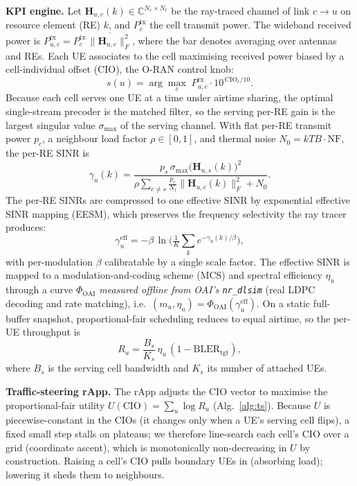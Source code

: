 \documentclass[conference]{IEEEtran}
\begin{document}
\textbf{KPI engine.} Let $\mathbf{H}_{u,c}(k)\in\mathbb{C}^{N_r\times N_t}$ be the
ray-traced channel of link $c\!\to\!u$ on resource element (RE) $k$, and
$P^{\mathrm{tx}}_c$ the cell transmit power. The wideband received power is
$P^{\mathrm{rx}}_{u,c}=P^{\mathrm{tx}}_c\,\overline{\lVert\mathbf{H}_{u,c}\rVert_F^2}$,
where the bar denotes averaging over antennas and REs. Each UE associates to the
cell maximising received power biased by a cell-individual offset (CIO), the
O-RAN control knob:
\begin{equation}
s(u)=\arg\max_{c}\; P^{\mathrm{rx}}_{u,c}\cdot 10^{\,\mathrm{CIO}_c/10}.
\label{eq:assoc}
\end{equation}
Because each cell serves one UE at a time under airtime sharing, the optimal
single-stream precoder is the matched filter, so the serving per-RE gain is the
largest singular value $\sigma_{\max}$ of the serving channel. With flat per-RE
transmit power $p_c$, a neighbour load factor $\rho\in[0,1]$, and thermal noise
$N_0=kTB\cdot\mathrm{NF}$, the per-RE SINR is
\begin{equation}
\gamma_u(k)=\frac{p_{s}\,\sigma_{\max}\!\big(\mathbf{H}_{u,s}(k)\big)^2}
{\rho\sum_{c\neq s}\frac{p_c}{N_t}\lVert\mathbf{H}_{u,c}(k)\rVert_F^2+N_0}.
\label{eq:sinr}
\end{equation}
The per-RE SINRs are compressed to one effective SINR by exponential effective
SINR mapping (EESM), which preserves the frequency selectivity the ray tracer
produces:
\begin{equation}
\gamma^{\mathrm{eff}}_u=-\beta\,\ln\!\Big(\tfrac{1}{K}\textstyle\sum_{k}
e^{-\gamma_u(k)/\beta}\Big),
\label{eq:eesm}
\end{equation}
with per-modulation $\beta$ calibratable by a single scale factor. The effective
SINR is mapped to a modulation-and-coding scheme (MCS) and spectral efficiency
$\eta_u$ through a curve $\Phi_{\mathrm{OAI}}$ \emph{measured offline from OAI's
\texttt{nr\_dlsim}} (real LDPC decoding and rate matching), i.e.\
$(m_u,\eta_u)=\Phi_{\mathrm{OAI}}(\gamma^{\mathrm{eff}}_u)$. On a static
full-buffer snapshot, proportional-fair scheduling reduces to equal airtime, so
the per-UE throughput is
\begin{equation}
R_u=\frac{B_{s}}{K_{s}}\,\eta_u\,(1-\mathrm{BLER}_{\mathrm{tgt}}),
\label{eq:rate}
\end{equation}
where $B_s$ is the serving cell bandwidth and $K_s$ its number of attached UEs.

\textbf{Traffic-steering rApp.} The rApp adjusts the CIO vector to maximise the
proportional-fair utility $U(\mathrm{CIO})=\sum_u\log R_u$ (Alg.~\ref{alg:ts}).
Because $U$ is piecewise-constant in the CIOs (it changes only when a UE's serving
cell flips), a fixed small step stalls on plateaus; we therefore line-search each
cell's CIO over a grid (coordinate ascent), which is monotonically non-decreasing
in $U$ by construction. Raising a cell's CIO pulls boundary UEs in (absorbing
load); lowering it sheds them to neighbours.
\end{document}
